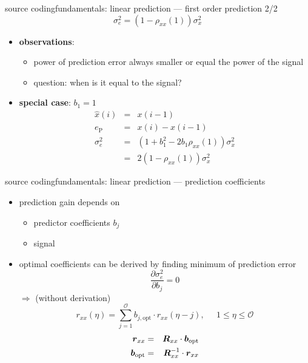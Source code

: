 	\begin{frame}{source coding}{fundamentals: linear prediction --- first order prediction 2/2}
        \begin{equation*}
            \sigma_e^2 = (1-\rho_{xx}(1))\sigma_x^2
        \end{equation*}
        
        \begin{itemize}
            \item             \textbf{observations}:
            \begin{itemize}
                \item   power of prediction error always smaller or equal the power of the signal
                \item   question: when is it equal to the signal?
            \end{itemize}
            \bigskip
            \item<2->   \textbf{special case}: $b_1 = 1$
                \begin{eqnarray*}
                    \hat{x}(i) &=& x(i-1)\\
                    e_\mathrm{P} &=& x(i) - x(i-1)\\
                    \sigma_e^2 &=& (1 + b_1^2 -2b_1\rho_{xx}(1))\sigma_x^2\\
                    &=& 2(1-\rho_{xx}(1))\sigma_x^2
                \end{eqnarray*}
        \end{itemize}
	\end{frame}
	\begin{frame}{source coding}{fundamentals: linear prediction --- prediction coefficients}
        \vspace{-3mm}
		\begin{itemize}
			\item	prediction gain depends on
				\begin{itemize}
					\item	predictor coefficients $b_j$
					\item	signal
				\end{itemize}
			\pause
            \bigskip
			\item	optimal coefficients can be derived by finding minimum of prediction error
				\begin{equation*}
					\frac{\partial \sigma_e^2}{\partial b_j} = 0
				\end{equation*}
				$\Rightarrow$ (without derivation)
			\begin{equation*}
				r_{xx}(\eta) = \sum\limits_{j=1}^{\mathcal{O}}{b_{j,\mathrm{opt}}\cdot r_{xx}(\eta-j)} ,\;\;\;\;\; 1 \leq\eta\leq\mathcal{O} 
			\end{equation*}	
            \begin{eqnarray*}
                \vec{r}_{xx} &=& \mat{R}_{xx}\cdot \vec{b}_\mathrm{opt}\\
                \vec{b}_\mathrm{opt} &=& \mat{R}_{xx}^{-1}\cdot \vec{r}_{xx}
            \end{eqnarray*}
		\end{itemize}						
	\end{frame}
